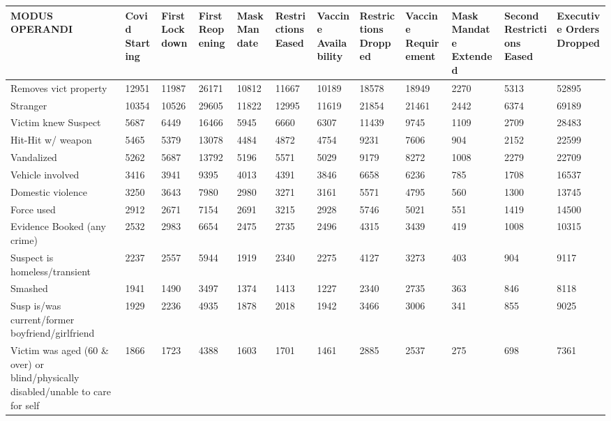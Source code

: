 \documentclass{article}
\begin{document}
\pagestyle{empty}

\begin{landscape}
\begin{table}[!ht]
    \centering
    \small
    \begin{tabular}{|p{2cm}|*{11}{p{1.7cm}|}}
    \hline
        MODUS OPERANDI & Covid Starting & First Lockdown & First Reopening & Mask Mandate & Restrictions Eased & Vaccine Availability & Restrictions Dropped & Vaccine Requirement & Mask Mandate Extended & Second Restrictions Eased & Executive Orders Dropped \\ \hline
        Removes vict property & 12951 & 11987 & 26171 & 10812 & 11667 & 10189 & 18578 & 18949 & 2270 & 5313 & 52895 \\ \hline
        Stranger & 10354 & 10526 & 29605 & 11822 & 12995 & 11619 & 21854 & 21461 & 2442 & 6374 & 69189 \\ \hline
        Victim knew Suspect & 5687 & 6449 & 16466 & 5945 & 6660 & 6307 & 11439 & 9745 & 1109 & 2709 & 28483 \\ \hline
        Hit-Hit w/ weapon & 5465 & 5379 & 13078 & 4484 & 4872 & 4754 & 9231 & 7606 & 904 & 2152 & 22599 \\ \hline
        Vandalized & 5262 & 5687 & 13792 & 5196 & 5571 & 5029 & 9179 & 8272 & 1008 & 2279 & 22709 \\ \hline
        Vehicle involved & 3416 & 3941 & 9395 & 4013 & 4391 & 3846 & 6658 & 6236 & 785 & 1708 & 16537 \\ \hline
        Domestic violence & 3250 & 3643 & 7980 & 2980 & 3271 & 3161 & 5571 & 4795 & 560 & 1300 & 13745 \\ \hline
        Force used & 2912 & 2671 & 7154 & 2691 & 3215 & 2928 & 5746 & 5021 & 551 & 1419 & 14500 \\ \hline
        Evidence Booked (any crime) & 2532 & 2983 & 6654 & 2475 & 2735 & 2496 & 4315 & 3439 & 419 & 1008 & 10315 \\ \hline
        Suspect is homeless/transient & 2237 & 2557 & 5944 & 1919 & 2340 & 2275 & 4127 & 3273 & 403 & 904 & 9117 \\ \hline
        Smashed & 1941 & 1490 & 3497 & 1374 & 1413 & 1227 & 2340 & 2735 & 363 & 846 & 8118 \\ \hline
        Susp is/was current/former boyfriend/girlfriend & 1929 & 2236 & 4935 & 1878 & 2018 & 1942 & 3466 & 3006 & 341 & 855 & 9025 \\ \hline
        Victim was aged (60 \& over) or blind/physically disabled/unable to care for self & 1866 & 1723 & 4388 & 1603 & 1701 & 1461 & 2885 & 2537 & 275 & 698 & 7361 \\ \hline

\end{tabular}
\end{table}
\end{landscape}
\end{document}
